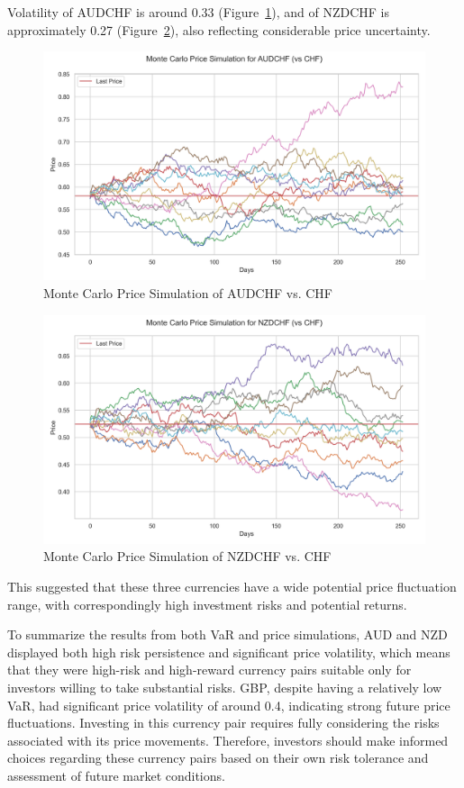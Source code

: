 \documentclass{article}
\begin{document}
Volatility of AUDCHF is around 0.33 (Figure~\ref{fig:monte_carlo_price_simulation_AUDCHF_vs_CHF}), and of NZDCHF is approximately 0.27 (Figure~\ref{fig:monte_carlo_price_simulation_NZDCHF_vs_CHF}), also reflecting considerable price uncertainty. 

\begin{figure}[H]
    \centering \includegraphics[width=0.75\linewidth]{../../reports/figures/monte_carlo_price_simulation_AUDCHF_vs_CHF.png}
    \caption{Monte Carlo Price Simulation of AUDCHF vs. CHF} \label{fig:monte_carlo_price_simulation_AUDCHF_vs_CHF}
\end{figure}

\begin{figure}[H]
    \centering  \includegraphics[width=0.75\linewidth]{../../reports/figures/monte_carlo_price_simulation_NZDCHF_vs_CHF.png}
    \caption{Monte Carlo Price Simulation of NZDCHF vs. CHF} \label{fig:monte_carlo_price_simulation_NZDCHF_vs_CHF}
\end{figure}
This suggested that these three currencies have a wide potential price fluctuation range, with correspondingly high investment risks and potential returns.

To summarize the results from both VaR and price simulations, AUD and NZD displayed both high risk persistence and significant price volatility, which means that they were high-risk and high-reward currency pairs suitable only for investors willing to take substantial risks. GBP, despite having a relatively low VaR, had significant price volatility of around 0.4, indicating strong future price fluctuations. Investing in this currency pair requires fully considering the risks associated with its price movements. Therefore, investors should make informed choices regarding these currency pairs based on their own risk tolerance and assessment of future market conditions.
\end{document}
